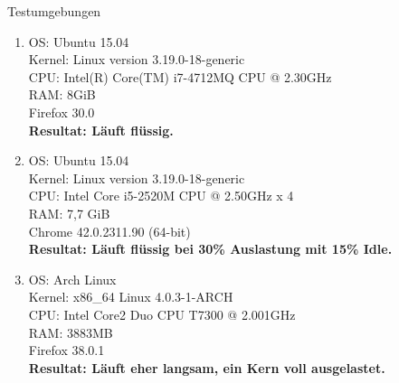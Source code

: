 \documentclass{beamer}
\begin{document}
\begin{frame}{Testumgebungen}
\small
\begin{enumerate}
\item OS: Ubuntu 15.04 \\
Kernel: Linux version 3.19.0-18-generic \\
CPU: Intel(R) Core(TM) i7-4712MQ CPU @ 2.30GHz \\
RAM: 8GiB \\
Firefox 30.0 \\
\textbf{Resultat: Läuft flüssig.}
\item OS: Ubuntu 15.04\\
Kernel: Linux version 3.19.0-18-generic \\ 
CPU: Intel Core i5-2520M CPU @ 2.50GHz x 4 \\
RAM: 7,7 GiB \\
Chrome 42.0.2311.90 (64-bit) \\
\textbf{Resultat: Läuft flüssig bei 30\% Auslastung mit 15\% Idle.}
\item OS: Arch Linux \\
Kernel: x86\_64 Linux 4.0.3-1-ARCH \\
CPU: Intel Core2 Duo CPU T7300 @ 2.001GHz \\
RAM: 3883MB \\
Firefox 38.0.1 \\
\textbf{Resultat: Läuft eher langsam, ein Kern voll ausgelastet.}
\end{enumerate}
\end{frame}
\end{document}

